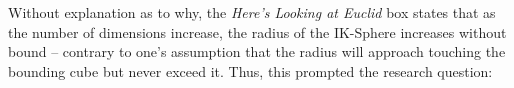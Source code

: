 Without explanation as to why, the \textit{Here's Looking at Euclid} box states that as the number of dimensions increase, the radius of the IK-Sphere increases without bound -- contrary to one's assumption that the radius will approach touching the bounding cube but never exceed it. Thus, this prompted the research question:
\researchquestion{}














